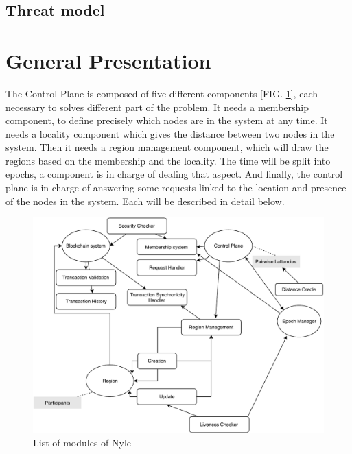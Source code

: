 \documentclass[a4paper,11pt,oneside]{report}
\begin{document}
\subsection{Threat model}



\section{General Presentation}

The Control Plane is composed of five different components [FIG.
\ref{fig:modules}], each necessary to solves different part of the problem. It
needs a membership component, to define precisely which nodes are in the system
at any time. It needs a locality component which gives the distance between two
nodes in the system. Then it needs a region management component, which will
draw the regions based on the membership and the locality. The time will be
split into epochs, a component is in charge of dealing that aspect. And
finally, the control plane is in charge of answering some requests linked to
the location and presence of the nodes in the system. Each will be described in
detail below. 


\begin{figure}[!h] \centering
\includegraphics[width=400pt]{figures/Nyle_components} \caption{List of modules
of Nyle} \label{fig:modules} \end{figure}
\end{document}
